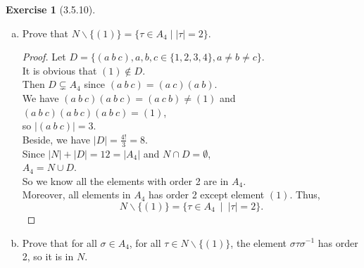 \documentclass{amsart}
\theoremstyle{plain}
\theoremstyle{definition}
\newtheorem{exer}[lem]{Exercise}
\begin{document}
\begin{exer}[3.5.10]
\begin{enumerate}[(a)]
\item 
Prove that $N\smallsetminus\{(1)\}=\{\tau\in A_4\mid|\tau|=2\}$.
\begin{proof}
  Let $D = \{(a~b~c),a,b,c \in \{1,2,3,4\}, a\neq b\neq c\}$. \\
  It is obvious that $(1) \not\in D$.\\
  Then $D \subsetneq A_4$ since $(a~b~c) = (a~c)(a~b)$.\\
  We have $(a~b~c)(a~b~c) = (a~c~b) \neq (1) $ and $(a~b~c)(a~b~c)(a~b~c) = (1)$, \\
  so $|(a~b~c)| = 3$. \\
  Beside, we have $|D| = \frac{4!}{3} = 8$. \\
  Since $|N| + |D| = 12 = |A_4|$ and $N \cap D = \emptyset $,\\
  $A_4 = N \cup D$.\\
  So we know all the elements with order 2 are in $A_4$. \\
  Moreover, all elements in $A_4$ has order 2 except element $(1)$.
  Thus,
  \[ N \smallsetminus \{(1)\} = \{\tau \in A_4~\mid~ |\tau| = 2\} .  \] 

\end{proof}

\item 
Prove that for all $\sigma\in A_4$, for all $\tau\in N\smallsetminus\{(1)\}$, the element $\sigma\tau\sigma^{-1}$ has order 2, so it is in $N$. 


\end{enumerate}
\end{exer}
\end{document}
